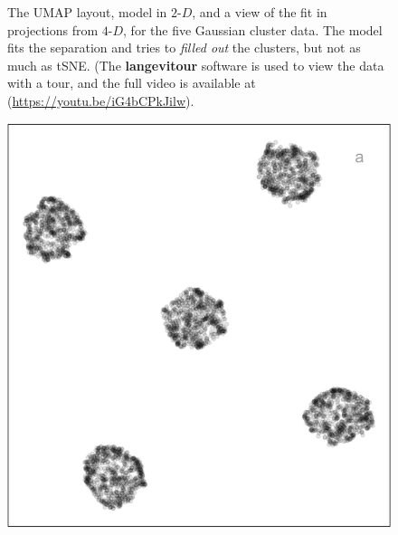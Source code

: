 \documentclass[
  12pt]{article}
\newcommand\gD{$2\text{-}D$}
\begin{document}
\begin{figure}[H]
\caption{\label{fig-gau-umap-sc}The UMAP layout, model in \gD{}, and a
view of the fit in projections from \(4\text{-}D\), for the five
Gaussian cluster data. The model fits the separation and tries to
\emph{filled out} the clusters, but not as much as tSNE. (The
\textbf{langevitour} software is used to view the data with a tour, and
the full video is available at (\url{https://youtu.be/iG4bCPkJilw}).}

\end{figure}%

\begin{figure}[H]

\begin{minipage}{0.33\linewidth}
\includegraphics{figures/five_gau_clusters/pacmap_layout.png}\end{minipage}%
%
\begin{minipage}{0.33\linewidth}

\end{minipage}
\end{figure}
\end{document}
